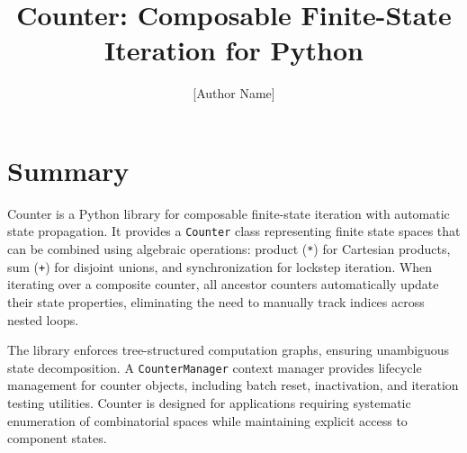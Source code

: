 \documentclass[10pt,a4paper,onecolumn]{article}
\title{Counter: Composable Finite-State Iteration for Python}
\author[1]{[Author Name]}
\affil[1]{[Institution], [City], [Country]}
\date{}
\begin{document}
\maketitle


\section{Summary}

Counter is a Python library for composable finite-state iteration with automatic 
state propagation. It provides a \texttt{Counter} class representing finite state 
spaces that can be combined using algebraic operations: product (\texttt{*}) for 
Cartesian products, sum (\texttt{+}) for disjoint unions, and synchronization for 
lockstep iteration. When iterating over a composite counter, all ancestor counters 
automatically update their state properties, eliminating the need to manually 
track indices across nested loops.

The library enforces tree-structured computation graphs, ensuring unambiguous 
state decomposition. A \texttt{CounterManager} context manager provides lifecycle 
management for counter objects, including batch reset, inactivation, and iteration 
testing utilities. Counter is designed for applications requiring systematic 
enumeration of combinatorial spaces while maintaining explicit access to component 
states.
\end{document}
